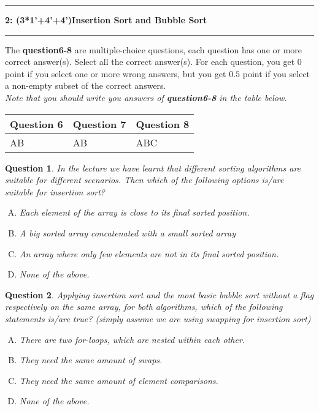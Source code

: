 \documentclass[10.5pt]{article}
\newcommand\question[2]{\vspace{.25in}\hrule\textbf{#1: #2}\vspace{.5em}\hrule\vspace{.10in}}
\newtheorem{Q}{Question}
\begin{document}
\pagebreak
\question{2}{(3*1'+4'+4')Insertion Sort and Bubble Sort}


The \textbf{question6-8} are multiple-choice questions, each question has one or more correct answer(s). Select all the correct answer(s). For each question, you get $0$ point if you select one or more wrong answers, but you get $0.5$ point if you select a non-empty subset of the correct answers.\\
\textit{Note that you should write you answers of \textbf{question6-8} in the table below.}
\begin{table}[htbp]
	\begin{tabular}{|p{2cm}|p{2cm}|p{2cm}|}
		\hline 
		Question 6 & Question 7 & Question 8\\
		\hline 
		AB&AB&ABC \\ 
		\hline 
	\end{tabular} 
\end{table}

    \begin{Q}
		In the lecture we have learnt that different sorting algorithms are suitable for different scenarios. Then which of the following options is/are suitable for insertion sort?
		\begin{enumerate}[(A)]
			\item Each element of the array is close to its final sorted position.
			\item A big sorted array concatenated with a small sorted array 
			\item An array where only few elements are not in its final sorted position.
			\item None of the above.
		\end{enumerate}
	\end{Q}
	
	\begin{Q}
		Applying insertion sort and the most basic bubble sort without a flag respectively on the same array, for both algorithms, which of the following statements is/are true? (simply assume we are using swapping for insertion sort)
		\begin{enumerate}[(A)]
			\item There are two for-loops, which are nested within each other.
			\item They need the same amount of swaps.
			\item They need the same amount of element comparisons.
			\item None of the above.
		\end{enumerate}
	\end{Q}
	
\end{document}
